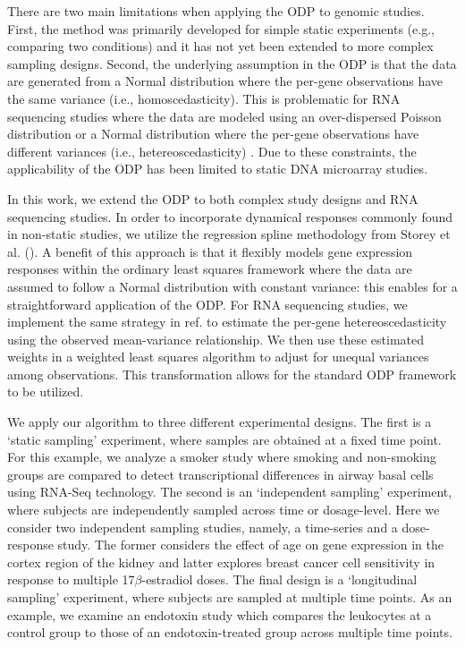 \documentclass[11pt]{article}
\begin{document}
There are two main limitations when applying the ODP to genomic studies. First, the method was primarily developed for simple static experiments (e.g., comparing two conditions) and it has not yet been extended to more complex sampling designs. Second, the underlying assumption in the ODP is that the data are generated from a Normal distribution where the per-gene observations have the same variance (i.e., homoscedasticity). This is problematic for RNA sequencing studies where the data are modeled using an over-dispersed Poisson distribution or a Normal distribution where the per-gene observations have different variances (i.e., hetereoscedasticity) \citep{law2014voom}. Due to these constraints, the applicability of the ODP has been limited to static DNA microarray studies.

In this work, we extend the ODP to both complex study designs and RNA sequencing studies. In order to incorporate dynamical responses commonly found in non-static studies, we utilize the regression spline methodology from Storey et al. (\citeyear{Storey_2005_time}). A benefit of this approach is that it flexibly models gene expression responses within the ordinary least squares framework where the data are assumed to follow a Normal distribution with constant variance: this enables for a straightforward application of the ODP. For RNA sequencing studies, we implement the same strategy in ref. \cite{law2014voom} to estimate the per-gene hetereoscedasticity using the observed mean-variance relationship. We then use these estimated weights in a weighted least squares algorithm to adjust for unequal variances among observations. This transformation allows for the standard ODP framework to be utilized.

We apply our algorithm to three different experimental designs. The first is a `static sampling' experiment, where samples are obtained at a fixed time point. For this example, we analyze a smoker study where smoking and non-smoking groups are compared to detect transcriptional differences in airway basal cells using RNA-Seq technology. The second is an `independent sampling' experiment, where subjects are independently sampled across time or dosage-level. Here we consider two independent sampling studies, namely, a time-series and a dose-response study. The former considers the effect of age on gene expression in the cortex region of the kidney and latter explores breast cancer cell sensitivity in response to multiple 17$\beta$-estradiol doses. The final design is a `longitudinal sampling' experiment, where subjects are sampled at multiple time points. As an example, we examine an endotoxin study which compares the leukocytes at a control group to those of an endotoxin-treated group across multiple time points.
\end{document}
